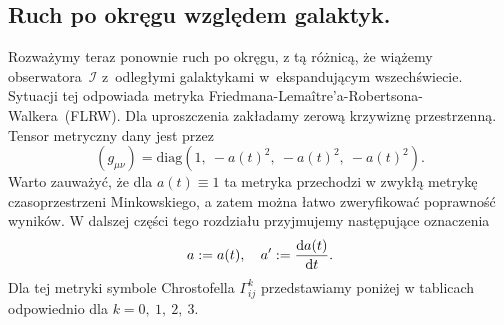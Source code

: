 \subsection{Ruch po okręgu względem galaktyk.}
Rozważymy teraz ponownie ruch po okręgu, z tą różnicą, że 
wiążemy obserwatora~$\mathcal{I}$ z~odległymi galaktykami w~ekspandującym 
wszechświecie. Sytuacji tej odpowiada metryka 
Friedmana-Lemaître’a-Robertsona-Walkera~(FLRW).
Dla uproszczenia zakładamy zerową krzywiznę przestrzenną.
Tensor metryczny dany jest przez
\begin{equation}\label{FLRWmetric}
(g_{\mu\nu}) = \text{diag} (1,\ -a(t)^2,\ -a(t)^2,\ -a(t)^2).
\end{equation}
Warto zauważyć, że dla $a(t) \equiv 1$ ta metryka przechodzi
w zwykłą metrykę czasoprzestrzeni Minkowskiego, a zatem 
można łatwo zweryfikować poprawność wyników.
W dalszej części tego rozdziału przyjmujemy następujące oznaczenia 
\begin{align}\nonumber
a:=a(t),\quad a':=\frac{\text{d} a(t)}{ \text{d} t}.
\end{align}
Dla tej metryki symbole Chrostofella $\Gamma^k _{ij}$ przedstawiamy
 poniżej w tablicach odpowiednio dla $k=0,\ 1,\ 2,\ 3$.
